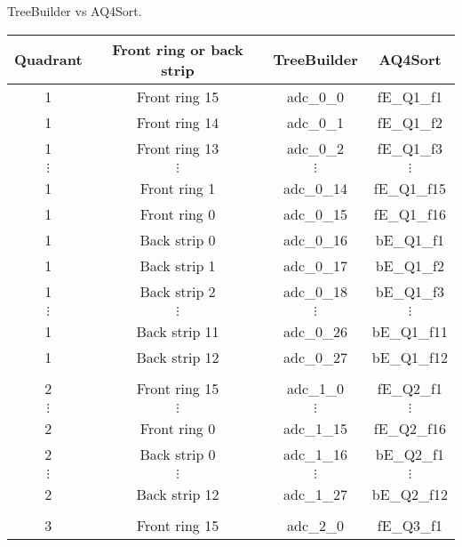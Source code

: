 \caption{TreeBuilder vs AQ4Sort.}
\label{tab:TBvsAQ4}
\begin{tabular}{cccc}
\hline
Quadrant  &  Front ring or back strip  &  TreeBuilder  &  AQ4Sort      \\
\hline
1         &  Front ring 15             &  adc\_0\_0    &  fE\_Q1\_f1   \\
1         &  Front ring 14             &  adc\_0\_1    &  fE\_Q1\_f2   \\
1         &  Front ring 13             &  adc\_0\_2    &  fE\_Q1\_f3   \\
$\vdots$  &  $\vdots$                  &  $\vdots$     &  $\vdots$     \\
1         &  Front ring 1              &  adc\_0\_14   &  fE\_Q1\_f15  \\
1         &  Front ring 0              &  adc\_0\_15   &  fE\_Q1\_f16  \\
1         &  Back strip 0              &  adc\_0\_16   &  bE\_Q1\_f1   \\
1         &  Back strip 1              &  adc\_0\_17   &  bE\_Q1\_f2   \\
1         &  Back strip 2              &  adc\_0\_18   &  bE\_Q1\_f3   \\
$\vdots$  &  $\vdots$                  &  $\vdots$     &  $\vdots$     \\
1         &  Back strip 11             &  adc\_0\_26   &  bE\_Q1\_f11  \\
1         &  Back strip 12             &  adc\_0\_27   &  bE\_Q1\_f12  \\
          &                            &               &               \\
2         &  Front ring 15             &  adc\_1\_0    &  fE\_Q2\_f1   \\
$\vdots$  &  $\vdots$                  &  $\vdots$     &  $\vdots$     \\
2         &  Front ring 0              &  adc\_1\_15   &  fE\_Q2\_f16  \\
2         &  Back strip 0              &  adc\_1\_16   &  bE\_Q2\_f1   \\
$\vdots$  &  $\vdots$                  &  $\vdots$     &  $\vdots$     \\
2         &  Back strip 12             &  adc\_1\_27   &  bE\_Q2\_f12  \\
          &                            &               &               \\
3         &  Front ring 15             &  adc\_2\_0    &  fE\_Q3\_f1   \\

\end{tabular}
